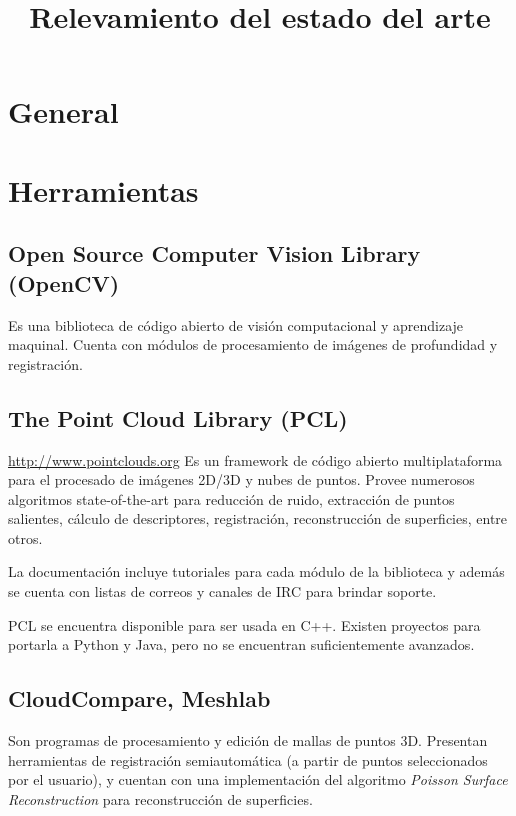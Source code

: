 \documentclass{pfc}
\title{Relevamiento del estado del arte}
\begin{document}
	\maketitle
	\section{General}

	\section{Herramientas}
		\subsection{Open Source Computer Vision Library (OpenCV)}
			Es una biblioteca de código abierto de
			visión computacional y aprendizaje maquinal.
			Cuenta con módulos de
			procesamiento de imágenes de profundidad
			y registración.


		\subsection{The Point Cloud Library (PCL)}
			\url{http://www.pointclouds.org}
			Es un framework de código abierto multiplataforma para el procesado de imágenes 2D/3D y nubes de puntos.
			Provee numerosos algoritmos state-of-the-art %
			para reducción de ruido, extracción de puntos salientes,
			cálculo de descriptores, registración,
			reconstrucción de superficies, entre otros.

			La documentación incluye tutoriales para cada módulo de la biblioteca
			y además se cuenta con listas de correos
			y canales de IRC para brindar soporte.

			PCL se encuentra disponible para ser usada en C++.
			Existen proyectos para portarla a Python y Java,
			pero no se encuentran suficientemente avanzados.

		\subsection{CloudCompare, Meshlab}
			Son programas de procesamiento y edición de mallas de puntos 3D.
			Presentan herramientas de registración semiautomática (a partir de
			puntos seleccionados por el usuario), y cuentan con una
			implementación del algoritmo \emph{Poisson Surface Reconstruction}
			para reconstrucción de superficies.
\end{document}
